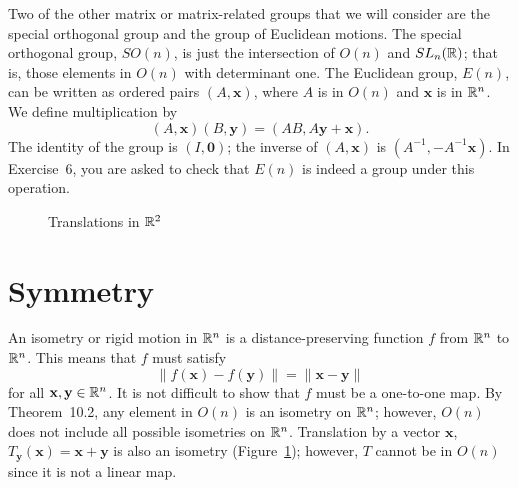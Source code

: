  
 
Two of the other matrix or matrix-related groups that we will consider
are the special orthogonal group  and the group of Euclidean motions.
The {\bfi special orthogonal group},
$SO(n)$\label{notespecialorthog}, is just the intersection of $O(n)$
and $SL_n({\Bbb R})$; that is, those elements in $O(n)$ with determinant
one. The {\bfi Euclidean
group},
$E(n)$\label{noteeuclidgroup}, can be written as ordered pairs $(A,
{\mathbf x})$, where $A$ is in $O(n)$ and ${\mathbf x}$ is in ${\Bbb
R}^n$. We define multiplication by
\[
(A, {\mathbf x}) (B, {\mathbf y})
=
(AB, A {\mathbf y} +{\mathbf x}).
\]
The identity of the group is $(I,{\mathbf 0})$; the inverse of $(A,
{\mathbf x})$ is $(A^{-1}, -A^{-1} {\mathbf x})$. In Exercise~6, you 
are asked to check that $E(n)$ is indeed a group under this operation.
 
 
 
 
\begin{figure}[hbt]

\begin{center}
\end{center}
\caption{Translations in ${\Bbb R}^2$}
\label{Isometries}
\end{figure}
 
 
 
 
 
\section{Symmetry}
 
 
 
 
An {\bfi isometry\/} or {\bfi rigid
motion\/} in ${\Bbb R}^n$  is a
distance-preserving function $f$ from ${\Bbb R}^n$ to ${\Bbb R}^n$.
This means that $f$ must satisfy 
\[
\| f({\mathbf x}) - f({\mathbf y}) \| =
\|{\mathbf x} - {\mathbf y} \|
\]
for all ${\mathbf x}, {\mathbf y} \in {\Bbb R}^n$. It is not difficult to
show that $f$ must be a one-to-one map. By Theorem~10.2, any element in
$O(n)$ is an isometry on ${\Bbb R}^n$; however, $O(n)$ does not
include all possible isometries on ${\Bbb R}^n$. Translation by a
vector ${\mathbf x}$, $T_{\mathbf y}({\mathbf x}) = {\mathbf x} + {\mathbf y}$
is also an isometry (Figure~\ref{Isometries}); however, $T$ cannot be
in $O(n)$ since it is not a linear map. 
 
